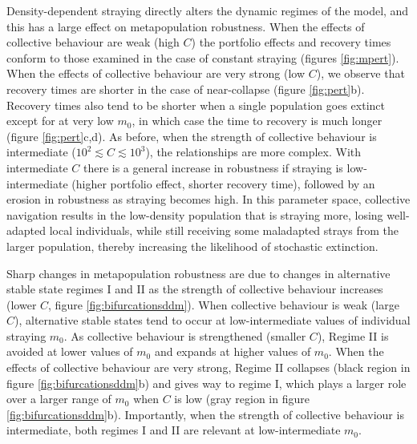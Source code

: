 \documentclass{revtex4}
\begin{document}
Density-dependent straying directly alters the dynamic regimes of the model, and this has a large effect on metapopulation robustness.
When the effects of collective behaviour are weak (high $C$) the portfolio effects and recovery times conform to those examined in the case of constant straying (figures \ref{fig:mpert}).
When the effects of collective behaviour are very strong (low $C$), we observe that recovery times are shorter in the case of near-collapse (figure \ref{fig:pert}b).
Recovery times also tend to be shorter when a single population goes extinct except for at very low $m_0$, in which case the time to recovery is much longer (figure \ref{fig:pert}c,d).
As before, when the strength of collective behaviour is intermediate ($10^{2} \lesssim C \lesssim 10^3$), the relationships are more complex.
With intermediate $C$ there is a general increase in robustness if straying is low-intermediate (higher portfolio effect, shorter recovery time), followed by an erosion in robustness as straying becomes high.
In this parameter space, collective navigation results in the low-density population that is straying more, losing well-adapted local individuals, while still receiving some maladapted strays from the larger population, thereby increasing the likelihood of stochastic extinction.



Sharp changes in metapopulation robustness are due to changes in alternative stable state regimes I and II as the strength of collective behaviour increases (lower $C$, figure \ref{fig:bifurcationsddm}). 
When collective behaviour is weak (large $C$), alternative stable states tend to occur at low-intermediate values of individual straying $m_0$.
As collective behaviour is strengthened (smaller $C$), Regime II is avoided at lower values of $m_0$ and expands at higher values of $m_0$.
When the effects of collective behaviour are very strong, Regime II collapses (black region in figure \ref{fig:bifurcationsddm}b) and gives way to regime I, which plays a larger role over a larger range of $m_0$ when $C$ is low (gray region in figure \ref{fig:bifurcationsddm}b).
Importantly, when the strength of collective behaviour is intermediate, both regimes I and II are relevant at low-intermediate $m_0$.\\
\end{document}
